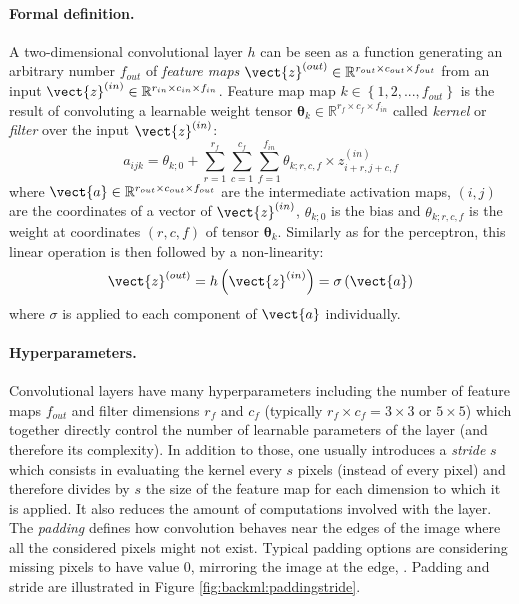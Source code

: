 \paragraph{Formal definition.} A two-dimensional convolutional layer $h$ can be seen as 
a function generating an arbitrary number $f_{out}$ of \textit{feature maps}
$\vect{z}^{(out)} \in \mathbb{R}^{r_{out} \times c_{out} \times f_{out}}$ from an input
$\vect{z}^{(in)} \in \mathbb{R}^{r_{in} \times c_{in} \times f_{in}}$. Feature map
map $k \in \left\{1, 2, ..., f_{out}\right\}$ is the result of convoluting a
learnable weight tensor $\pmb{\theta}_k \in \mathbb{R}^{r_f \times c_f \times f_{in}}$
called \textit{kernel} or \textit{filter} over the input $\vect{z}^{(in)}$:
\begin{equation}
\label{eqn:backml:convnet}
a_{ijk} = \theta_{k;0} + \sum_{r=1}^{r_f} \sum_{c=1}^{c_f} \sum_{f=1}^{f_{in}} \theta_{k;r,c,f} \times z^{(in)}_{i+r,j+c,f}
\end{equation}
where $\vect{a} \in \mathbb{R}^{r_{out} \times c_{out} \times f_{out}}$ are the intermediate activation maps, $(i, j)$ are the coordinates of a vector of $\vect{z}^{(in)}$, $\theta_{k;0}$
is the bias and $\theta_{k;r,c,f}$ is the weight at coordinates $(r,c,f)$
of tensor $\pmb{\theta}_k$. Similarly 
as for the perceptron, this linear operation is then followed by a non-linearity:
\begin{equation}
\label{eqn:backml:convnetwithactiv}
\vect{z}^{(out)} = h\left(\vect{z}^{(in)}\right) = \sigma\left(\vect{a}\right)
\end{equation}
where $\sigma$ is applied to each component of $\vect{a}$ individually. 

\paragraph{Hyperparameters.} Convolutional layers have many hyperparameters including the number of feature
maps $f_{out}$ and filter dimensions $r_f$ and $c_f$ (typically $r_f \times c_f = 3 \times 3$
or $5 \times 5$) which together directly control the number of learnable parameters
of the layer (and therefore its complexity). In addition to those, one usually introduces a 
\textit{stride} $s$ which consists in evaluating the kernel every $s$ pixels (instead of
every pixel) and therefore divides by $s$ the size of the feature map for each dimension 
to which it is applied. It also reduces the amount of computations involved with the layer. 
The \textit{padding} defines how convolution behaves near the edges of the image where
all the considered pixels might not exist. Typical padding options are considering
missing pixels to have value 0, mirroring the image at the edge, \etc. Padding
and stride are illustrated in Figure \ref{fig:backml:paddingstride}.

